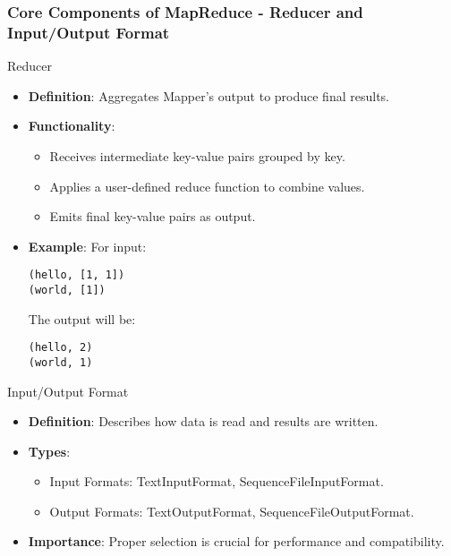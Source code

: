 \documentclass[aspectratio=169]{beamer}
\begin{document}
\begin{frame}[fragile]
    \frametitle{Core Components of MapReduce - Reducer and Input/Output Format}
    \begin{block}{Reducer}
        \begin{itemize}
            \item \textbf{Definition}: Aggregates Mapper's output to produce final results.
            \item \textbf{Functionality}:
            \begin{itemize}
                \item Receives intermediate key-value pairs grouped by key.
                \item Applies a user-defined reduce function to combine values.
                \item Emits final key-value pairs as output.
            \end{itemize}
            \item \textbf{Example}: For input:
            \begin{verbatim}
(hello, [1, 1])
(world, [1])
            \end{verbatim}
            The output will be:
            \begin{verbatim}
(hello, 2)
(world, 1)
            \end{verbatim}
        \end{itemize}
    \end{block}
    
    \begin{block}{Input/Output Format}
        \begin{itemize}
            \item \textbf{Definition}: Describes how data is read and results are written.
            \item \textbf{Types}:
            \begin{itemize}
                \item Input Formats: TextInputFormat, SequenceFileInputFormat.
                \item Output Formats: TextOutputFormat, SequenceFileOutputFormat.
            \end{itemize}
            \item \textbf{Importance}: Proper selection is crucial for performance and compatibility.
        \end{itemize}
    \end{block}
\end{frame}
\end{document}
